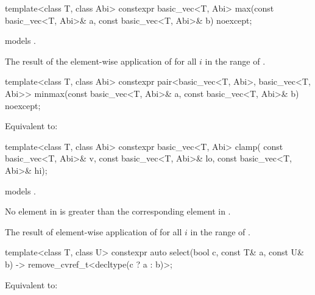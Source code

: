 \begin{itemdecl}
template<class T, class Abi>
  constexpr basic_vec<T, Abi> max(const basic_vec<T, Abi>& a,
                                  const basic_vec<T, Abi>& b) noexcept;
\end{itemdecl}

\begin{itemdescr}
\pnum
\constraints
{} models .

\pnum
\returns
The result of the element-wise application of  for
all $i$ in the range of .
\end{itemdescr}

\begin{itemdecl}
template<class T, class Abi>
  constexpr pair<basic_vec<T, Abi>, basic_vec<T, Abi>>
    minmax(const basic_vec<T, Abi>& a, const basic_vec<T, Abi>& b) noexcept;
\end{itemdecl}

\begin{itemdescr}
\pnum
\effects
Equivalent to: 
\end{itemdescr}

\begin{itemdecl}
template<class T, class Abi>
  constexpr basic_vec<T, Abi> clamp(
    const basic_vec<T, Abi>& v, const basic_vec<T, Abi>& lo, const basic_vec<T, Abi>& hi);
\end{itemdecl}

\begin{itemdescr}
\pnum
\constraints
{} models .

\pnum
\expects
No element in  is greater than the corresponding element in
.

\pnum
\returns
The result of element-wise application of  for all $i$ in the range of .
\end{itemdescr}

\begin{itemdecl}
template<class T, class U>
  constexpr auto select(bool c, const T& a, const U& b)
  -> remove_cvref_t<decltype(c ? a : b)>;
\end{itemdecl}

\begin{itemdescr}
\pnum
\effects
Equivalent to: 
\end{itemdescr}


